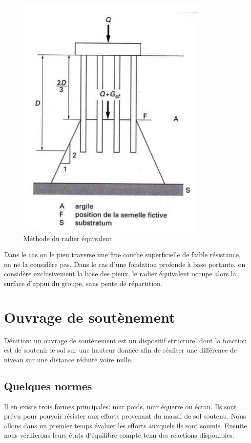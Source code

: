         \begin{figure}[h!]
            \centering
            \includegraphics[scale=0.8]{Holeyman/images/H44.PNG}
            \caption{Méthode du radier équivalent }
        \end{figure}

        Dans le cas ou le pieu traverse une fine couche superficielle de faible résistance, on ne la considère pas. Dans le cas d'une fondation profonde à base portante, on considère exclusivement la base des pieux, le radier équivalent occupe alors la surface d'appui du groupe, sans pente de répartition.
        
\section{Ouvrage de soutènement}

    Dénition: un ouvrage de soutènement est un dispositif structurel dont la fonction est de soutenir le sol sur une hauteur donnée afin de réaliser une différence de niveau sur une distance réduite voire nulle.
    
    \subsection{Quelques normes}
    
        Il en existe trois formes principales: mur poids, mur équerre ou écran. Ils sont prévu pour pouvoir résister aux efforts provenant du massif de sol soutenu. Nous allons dans un premier temps évaluer les efforts auxquels ils sont soumis. Ensuite nous vérifierons leurs états d'équilibre compte tenu des réactions disponibles. 
        
